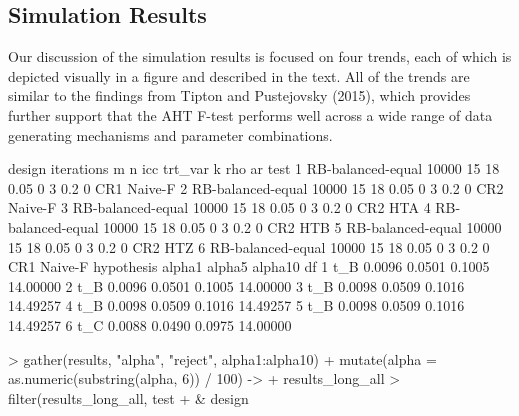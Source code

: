 \documentclass[12pt]{article}
\begin{document}
\subsection{Simulation Results}

Our discussion of the simulation results is focused on four trends, each of which is depicted visually in a figure and described in the text. 
All of the trends are similar to the findings from Tipton and Pustejovsky (2015), which provides further support that the AHT F-test performs well across a wide range of data generating mechanisms and parameter combinations.

\begin{Schunk}
\begin{Soutput}
             design iterations  m  n  icc trt_var k rho ar        test
1 RB-balanced-equal      10000 15 18 0.05       0 3 0.2  0 CR1 Naive-F
2 RB-balanced-equal      10000 15 18 0.05       0 3 0.2  0 CR2 Naive-F
3 RB-balanced-equal      10000 15 18 0.05       0 3 0.2  0     CR2 HTA
4 RB-balanced-equal      10000 15 18 0.05       0 3 0.2  0     CR2 HTB
5 RB-balanced-equal      10000 15 18 0.05       0 3 0.2  0     CR2 HTZ
6 RB-balanced-equal      10000 15 18 0.05       0 3 0.2  0 CR1 Naive-F
  hypothesis alpha1 alpha5 alpha10       df
1        t_B 0.0096 0.0501  0.1005 14.00000
2        t_B 0.0096 0.0501  0.1005 14.00000
3        t_B 0.0098 0.0509  0.1016 14.49257
4        t_B 0.0098 0.0509  0.1016 14.49257
5        t_B 0.0098 0.0509  0.1016 14.49257
6        t_C 0.0088 0.0490  0.0975 14.00000
\end{Soutput}
\begin{Sinput}
> gather(results, "alpha", "reject", alpha1:alpha10) %>%
+   mutate(alpha = as.numeric(substring(alpha, 6)) / 100) ->
+   results_long_all
> filter(results_long_all, test %in% c("CR1 Naive-F", "CR2 HTZ") 
+        & design %in% c("CR-balanced","CR-unbalanced","DD-balanced-unbalanced",

\end{Sinput}
\end{Schunk}
\end{document}
